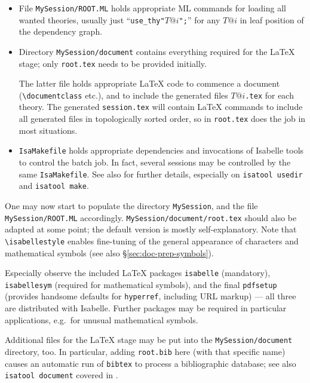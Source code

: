 \begin{isabellebody}
\begin{isamarkuptext}
\begin{itemize}
  \item File \texttt{MySession/ROOT.ML} holds appropriate ML commands
  for loading all wanted theories, usually just
  ``\texttt{use_thy"$T@i$";}'' for any $T@i$ in leaf position of the
  dependency graph.

  \item Directory \texttt{MySession/document} contains everything
  required for the {\LaTeX} stage; only \texttt{root.tex} needs to be
  provided initially.

  The latter file holds appropriate {\LaTeX} code to commence a
  document (\verb,\documentclass, etc.), and to include the generated
  files $T@i$\texttt{.tex} for each theory.  The generated
  \texttt{session.tex} will contain {\LaTeX} commands to include all
  generated files in topologically sorted order, so
  \verb,, in \texttt{root.tex} does the job in most
  situations.

  \item \texttt{IsaMakefile} holds appropriate dependencies and
  invocations of Isabelle tools to control the batch job.  In fact,
  several sessions may be controlled by the same \texttt{IsaMakefile}.
  See also \cite{isabelle-sys} for further details, especially on
  \texttt{isatool usedir} and \texttt{isatool make}.

  \end{itemize}

  One may now start to populate the directory \texttt{MySession}, and
  the file \texttt{MySession/ROOT.ML} accordingly.
  \texttt{MySession/document/root.tex} should also be adapted at some
  point; the default version is mostly self-explanatory.  Note that
  \verb,\isabellestyle, enables fine-tuning of the general appearance
  of characters and mathematical symbols (see also
  \S\ref{sec:doc-prep-symbols}).

  Especially observe the included {\LaTeX} packages \texttt{isabelle}
  (mandatory), \texttt{isabellesym} (required for mathematical
  symbols), and the final \texttt{pdfsetup} (provides handsome
  defaults for \texttt{hyperref}, including URL markup) --- all three
  are distributed with Isabelle. Further packages may be required in
  particular applications, e.g.\ for unusual mathematical symbols.

  \medskip Additional files for the {\LaTeX} stage may be put into the
  \texttt{MySession/document} directory, too.  In particular, adding
  \texttt{root.bib} here (with that specific name) causes an automatic
  run of \texttt{bibtex} to process a bibliographic database; see also
  \texttt{isatool document} covered in \cite{isabelle-sys}.


\end{isamarkuptext}
\end{isabellebody}
